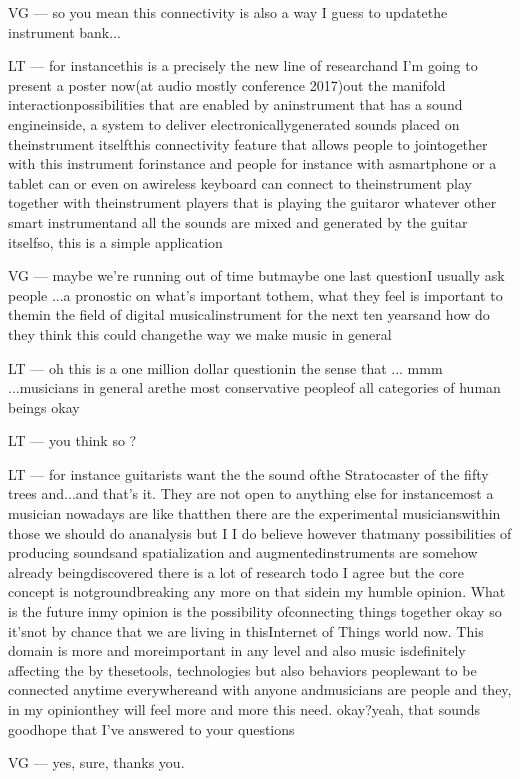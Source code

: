 VG — so you mean this connectivity is also a way I guess to updatethe instrument bank... 

LT — for instancethis is a precisely the new line of researchand I'm going to present a poster now(at audio mostly conference  2017)out the manifold interactionpossibilities that are enabled by aninstrument that has a sound engineinside, a system to deliver electronicallygenerated sounds placed on theinstrument itselfthis connectivity feature that allows people to jointogether with this instrument forinstance and people for instance with asmartphone or a tablet can or even on awireless keyboard can connect to theinstrument play together with theinstrument players that is playing the guitaror whatever other smart instrumentand all the sounds are mixed and generated by the guitar itselfso, this is a simple application

VG — maybe we're running out of time butmaybe one last questionI usually ask people ...a pronostic on what's important tothem, what they feel is important to themin the field of digital musicalinstrument for the next ten yearsand how do they think this could changethe way we make music in general

LT — oh this is a one million dollar questionin the sense that ... mmm ...musicians in general arethe most conservative peopleof all categories of human beings okay

LT — you think so ?

LT — for instance guitarists want the the sound ofthe Stratocaster of the fifty trees and...and that's it. They are not open to anything else for instancemost a musician nowadays are like thatthen there are the experimental musicianswithin those we should do ananalysis but I I do believe however thatmany possibilities of producing soundsand spatialization and augmentedinstruments are somehow already beingdiscovered there is a lot of research todo I agree but the core concept is notgroundbreaking any more on that sidein my humble opinion. What is the future inmy opinion is the possibility ofconnecting things together okay so it'snot by chance that we are living in thisInternet of Things world now. This domain is more and moreimportant in any level and also music isdefinitely affecting the by thesetools, technologies but also behaviors peoplewant to be connected anytime everywhereand with anyone andmusicians are people and they, in my opinionthey will feel more and more this need. okay?yeah, that sounds goodhope that I've answered to your questions

VG — yes, sure, thanks you.